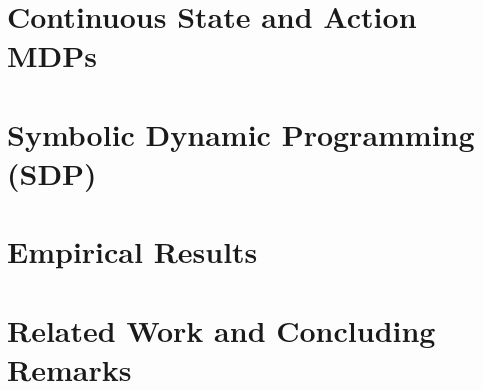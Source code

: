 \documentclass[letterpaper]{article}
\begin{document}


\section{Continuous State and Action MDPs}



\section{Symbolic Dynamic Programming (SDP)}



\vspace{-5mm}
\section{Empirical Results}



\section{Related Work and Concluding Remarks}








\end{document}
